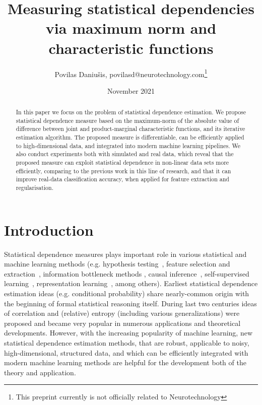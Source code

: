 \documentclass{article}
\title{Measuring statistical dependencies via maximum norm and characteristic functions}
\author{Povilas Daniu\v{s}is, povilasd@neurotechnology.com\footnote{This preprint currently is not officially related to Neurotechnology}}
\date{November 2021}
\begin{document}
\maketitle

%

\begin{abstract}
    In this paper we focus on the problem of statistical dependence estimation. We propose statistical dependence measure based on the maximum-norm of the absolute value of difference between joint and product-marginal characteristic functions, and its iterative estimation algorithm. The proposed measure is differentiable, can be efficiently applied to high-dimensional data, and integrated into modern machine learning pipelines. We also conduct experiments both with simulated and real data, which reveal that the proposed measure can exploit statistical dependence in non-linear data sets more efficiently, comparing to the previous work in this line of research, and that it can improve real-data classification accuracy, when applied for feature extraction and regularisation.

\end{abstract}

\section{Introduction}
Statistical dependence measures plays important role in various statistical and machine learning methods (e.g. hypothesis testing~\cite{Gretton2005MeasuringSD}, feature selection and extraction~\cite{EigenHSIC,HSCA}, information bottleneck methods \cite{Ma2020TheHB}, causal inference~\cite{NIPS2008_f7664060}, self-supervised learning~\cite{li2021selfsupervised}, representation learning~\cite{Ragonesi2021LearningUR}, among others).  Earliest statistical dependence estimation ideas (e.g. conditional probability) share nearly-common origin with the beginning of formal statistical reasoning itself. During last two centuries ideas of correlation and (relative) entropy (including various generalizations) were proposed and became very popular in numerous applications and theoretical developments. However, with the increasing popularity of machine learning, new statistical dependence estimation methods, that are robust, applicable to noisy, high-dimensional, structured data, and which can be efficiently integrated with modern machine learning methods are helpful for the development both of the theory and application.
\end{document}
